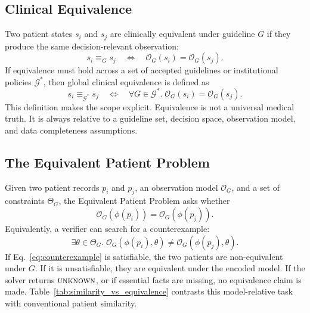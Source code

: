 \documentclass[english,5p,twocolumn,preprint]{elsarticle}
\newcommand{\Guides}{\mathcal{G}}
\newcommand{\Obs}{\mathcal{O}}
\newcommand{\unknown}{\textsc{unknown}}
\begin{document}
\subsection{Clinical Equivalence}
Two patient states $s_i$ and $s_j$ are clinically equivalent under guideline $G$ if they produce the same decision-relevant observation:
\begin{equation}
\label{eq:epp_guideline}
    s_i \equiv_G s_j \quad \Longleftrightarrow \quad \Obs_G(s_i) = \Obs_G(s_j).
\end{equation}
If equivalence must hold across a set of accepted guidelines or institutional policies $\Guides^*$, then global clinical equivalence is defined as
\begin{equation}
\label{eq:epp_global}
    s_i \equiv_{\Guides^*} s_j \quad \Longleftrightarrow \quad \forall G \in \Guides^*.\; \Obs_G(s_i) = \Obs_G(s_j).
\end{equation}
This definition makes the scope explicit. Equivalence is not a universal medical truth. It is always relative to a guideline set, decision space, observation model, and data completeness assumptions.

\subsection{The Equivalent Patient Problem}
Given two patient records $p_i$ and $p_j$, an observation model $\Obs_G$, and a set of constraints $\Theta_G$, the Equivalent Patient Problem asks whether
\begin{equation}
    \Obs_G(\phi(p_i)) = \Obs_G(\phi(p_j)).
\end{equation}
Equivalently, a verifier can search for a counterexample:
\begin{equation}
\label{eq:counterexample}
    \exists \theta \in \Theta_G.\; \Obs_G(\phi(p_i),\theta) \neq \Obs_G(\phi(p_j),\theta).
\end{equation}
If Eq.~\eqref{eq:counterexample} is satisfiable, the two patients are non-equivalent under $G$. If it is unsatisfiable, they are equivalent under the encoded model. If the solver returns $\unknown$, or if essential facts are missing, no equivalence claim is made. Table~\ref{tab:similarity_vs_equivalence} contrasts this model-relative task with conventional patient similarity.
\end{document}
